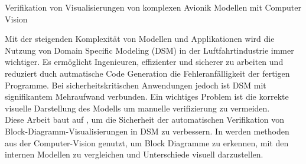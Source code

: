 \label{kurzzusammenfassung}
{\LARGE Verifikation von Visualisierungen von komplexen Avionik Modellen mit Computer Vision}

Mit der steigenden Komplexität von Modellen und Applikationen wird die Nutzung von Domain Specific Modeling (DSM) in der Luftfahrtindustrie immer wichtiger. Es ermöglicht Ingenieuren, effizienter und sicherer zu arbeiten und reduziert duch autmatische Code Generation die Fehleranfälligkeit der fertigen Programme. Bei sicherheitskritischen Anwendungen jedoch ist DSM mit signifikantem Mehraufwand verbunden. Ein wichtiges Problem ist die korrekte visuelle Darstellung des Modells um manuelle verifizierung zu vermeiden.\\
Diese Arbeit baut auf \cite{og_paper}, um die Sicherheit der automatischen Verifikation von Block-Diagramm-Visualisierungen in DSM zu verbessern. In \cite{og_paper} werden methoden aus der Computer-Vision genutzt, um Block Diagramme zu erkennen, mit den internen Modellen zu vergleichen und Unterschiede visuell darzustellen. 